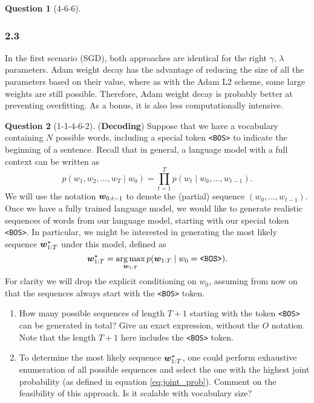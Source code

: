 \documentclass[12pt]{article}
\theoremstyle{definition}
\newtheorem{exercise}{Question}%
\begin{document}
\begin{exercise}[4-6-6]
{    \subsubsection*{2.3}
    In the first scenario (SGD), both approaches are identical for the right
    $\gamma,\, \lambda$ parameters. Adam weight decay has the advantage of reducing the
    size of all the parameters based on their value, where as with the Adam L2
    scheme, some large weights are still possible. Therefore, Adam weight decay
    is probably better at preventing overfitting. As a bonus, it is also less
    computationally intensive.
    }
\end{exercise}

\begin{exercise}[1-1-4-6-2] (\textbf{Decoding})
\label{ex:decoding}
    Suppose that we have a vocabulary containing $N$ possible words, including a special token \texttt{<BOS>} to indicate the beginning of a sentence. Recall that in general, a language model with a full context can be written as
    \begin{equation*}
        p(w_{1}, w_{2}, \ldots, w_{T} \mid w_{0}) = \prod_{t=1}^{T} p(w_{t} \mid w_{0}, \ldots, w_{t-1}).
    \end{equation*}
    We will use the notation ${\bm{w}}_{0:t-1}$ to denote the (partial) sequence $(w_{0}, \ldots, w_{t-1})$. Once we have a fully trained language model, we would like to generate realistic sequences of words from our language model, starting with our special token \texttt{<BOS>}. In particular, we might be interested in generating the most likely sequence ${\bm{w}}_{1:T}^{\star}$ under this model, defined as
    \begin{equation}
        {\bm{w}}_{1:T}^{\star} = \operatorname*{arg\,max}_{{\bm{w}}_{1:T}} p({\bm{w}}_{1:T} \mid w_{0} = \textrm{\texttt{<BOS>}}).
        \label{eq:joint_prob}
    \end{equation}
    For clarity we will drop the explicit conditioning on $w_{0}$, assuming from now on that the sequences always start with the \texttt{<BOS>} token.
    
    \begin{enumerate}[label=\arabic{exercise}.\arabic*]
        \item How many possible sequences of length $T+1$ starting with the token \texttt{<BOS>} can be generated in total? Give an exact expression, without the $O$ notation. Note that the length $T+1$ here includes the \texttt{<BOS>} token.
        
        \item To determine the most likely sequence ${\bm{w}}_{1:T}^{\star}$, one could perform exhaustive enumeration of all possible sequences and select the one with the highest joint probability (as defined in equation \ref{eq:joint_prob}). Comment on the feasibility of this approach. Is it scalable with vocabulary size?
    

\end{enumerate}
\end{exercise}
\end{document}
